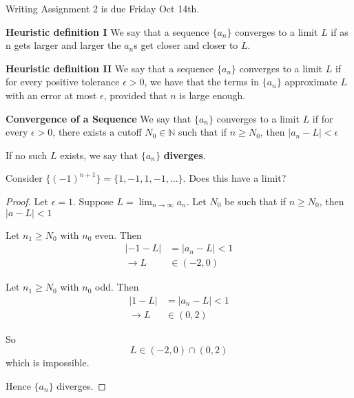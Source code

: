 
Writing Assignment 2 is due Friday Oct 14th.

\begin{defn} \textbf{Heuristic definition I }
We say that a sequence $\{a_n\}$ converges to a limit $L$ if as n gets larger and larger the $a_n$s get closer and closer to $L$.
\end{defn}
\begin{defn} \textbf{Heuristic definition II }
We say that a sequence $\{a_n\}$ converges to a limit $L$ if for every positive tolerance $\epsilon > 0$, we have that the terms in $\{a_n\}$ approximate $L$ with an error at most $\epsilon$, provided that $n$ is large enough.
\end{defn}

\begin{defn}
\textbf{Convergence of a Sequence} We say that $\{a_n\}$ converges to a limit $L$ if for every $\epsilon > 0$, there exists a cutoff $N_0\in \mathbb{N}$ such that if $n\geq N_0$, then $|a_n-L|<\epsilon$

If no such $L$ exists, we say that $\{a_n\}$ \textbf{diverges}.
\end{defn}



\begin{exmp}
Consider $\{(-1)^{n+1}\} = \{1,-1,1,-1,\dots\} $. Does this have a limit?
\end{exmp} 

\begin{proof}
Let $\epsilon = 1$. Suppose $L = \lim_{n\to \infty} a_n$. Let $N_0$ be such that if $n\geq N_0$, then $|a-L|<1$

Let $n_1 \geq N_0$ with $n_0$ even. Then
\begin{align*}
    |-1-L| &= |a_n - L| < 1\\
\to L &\in (-2,0)
\end{align*}

Let $n_1 \geq N_0$ with $n_0$ odd. Then 
\begin{align*}
    |1-L| &= |a_n - L| < 1\\
\to L &\in (0,2)
\end{align*}

So \begin{equation*}
    L \in (-2,0) \cap (0,2)
\end{equation*}
which is impossible.

Hence $\{a_n\}$ diverges.
\end{proof}


